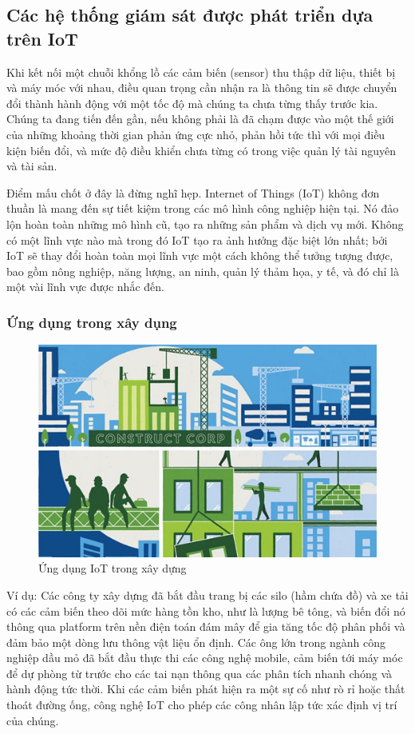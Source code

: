 	
\subsection{Các hệ thống giám sát được phát triển dựa trên IoT}
Khi kết nối một chuỗi khổng lồ các cảm biến (sensor) thu thập dữ liệu, thiết bị và máy móc với nhau, điều quan trọng cần nhận ra là thông tin sẽ được chuyển đổi thành hành động với một tốc độ mà chúng ta chưa từng thấy trước kia. Chúng ta đang tiến đến gần, nếu không phải là đã chạm được vào một thế giới của những khoảng thời gian phản ứng cực nhỏ, phản hồi tức thì với mọi điều kiện biến đổi, và mức độ điều khiển chưa từng có trong việc quản lý tài nguyên và tài sản.

Điểm mấu chốt ở đây là đừng nghĩ hẹp. Internet of Things (IoT) không đơn thuần là mang đến sự tiết kiệm trong các mô hình công nghiệp hiện tại. Nó đảo lộn hoàn toàn những mô hình cũ, tạo ra những sản phẩm và dịch vụ mới. Không có một lĩnh vực nào mà trong đó IoT tạo ra ảnh hưởng đặc biệt lớn nhất; bởi IoT sẽ thay đổi hoàn toàn mọi lĩnh vực một cách không thể tưởng tượng được, bao gồm nông nghiệp, năng lượng, an ninh, quản lý thảm họa, y tế, và đó chỉ là một vài lĩnh vực được nhắc đến.

\subsubsection*{Ứng dụng trong xây dụng }
\begin{figure}[H] 
\centering    
\includegraphics[width=1\textwidth]{pic8}
\caption[Ứng dụng IoT trong xây dựng ]{Ứng dụng IoT trong xây dựng }
\label{fig:pic8}
\end{figure}

Ví dụ: Các công ty xây dựng đã bắt đầu trang bị các silo (hầm chứa đồ) và xe tải có các cảm biến theo dõi mức hàng tồn kho, như là lượng bê tông, và biến đổi nó thông qua platform trên nền điện toán đám mây để gia tăng tốc độ phân phối và đảm bảo một dòng lưu thông vật liệu ổn định. Các ông lớn trong ngành công nghiệp dầu mỏ đã bắt đầu thực thi các công nghệ mobile, cảm biến tới máy móc để dự phòng từ trước cho các tai nạn thông qua các phân tích nhanh chóng và hành động tức thời. Khi các cảm biến phát hiện ra một sự cố như rò rỉ hoặc thất thoát đường ống, công nghệ IoT cho phép các công nhân lập tức xác định vị trí của chúng.

